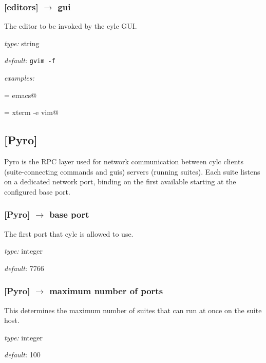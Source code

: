 \subsubsection[gui]{[editors] $\rightarrow$ gui}

The editor to be invoked by the cylc GUI.

\begin{myitemize}
\item {\em type:} string
\item {\em default:} \lstinline=gvim -f=
\item {\em examples:}
    \begin{myitemize}
            \item \lstinline@gui = emacs@
            \item \lstinline@gui = xterm -e vim@
    \end{myitemize}
\end{myitemize}


\subsection{[Pyro]}

Pyro is the RPC layer used for network communication between cylc
clients (suite-connecting commands and guis) servers (running suites).
Each suite listens on a dedicated network port, binding on the first
available starting at the configured base port.

\subsubsection[base port]{[Pyro] $\rightarrow$ base port }

The first port that cylc is allowed to use.

\begin{myitemize}
\item {\em type:} integer
\item {\em default:} 7766
\end{myitemize}

\subsubsection[maximum number of ports]{[Pyro] $\rightarrow$ maximum number of ports}

This determines the maximum number of suites that can run at once on the
suite host.

\begin{myitemize}
\item {\em type:} integer
\item {\em default:} 100
\end{myitemize}

